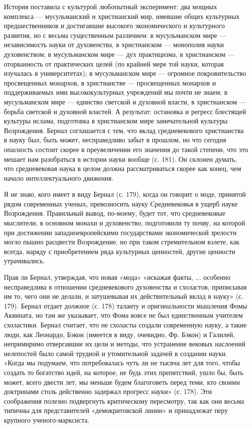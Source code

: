 История  поставила  с  культурой любопытный  эксперимент:  два  мощных
комплекса  ---   мусульманский  и  христианский  мир,   имевшие  общих
культурных  предшественников  и  достигавшие  высокого  экономического
и  культурного  развития,  но   с  весьма  существенным  различием:  в
мусульманском  мире   ---  независимость   науки  от   духовенства,  в
христианском ---  монополия науки  духовенством; в  мусульманском мире
--- дух  практицизма, в христианском ---  оторванность от практических
целей (по крайней мере той  науки, которая изучалась в университетах);
в  мусульманском   мире  ---  огромное   покровительство  просвещенных
монархов, в  христианстве ---  просвещенных монархов  и поддерживаемых
ими  высококультурных учреждений  мы почти  не знаем;  в мусульманском
мире  ---   единство  светской  и  духовной   власти,  в  христианском
---  борьба  светской  и  духовной  властей.  А  результат:  остановка
и  регресс  блестящей  культуры   ислама,  подготовка  в  христианском
мире  замечательной культуры  Возрождения. Бернал  соглашается с  тем,
что  вклад  средневекового  христианства  в  науку  был,  быть  может,
несправедливо забыт в прошлом, но что сегодня опасность состоит скорее
в  преувеличении его  значения до  такой степени,  что это  мешает нам
разобраться в  истории науки вообще  (с. 181). Он склонен  думать, что
средневековая наука  в целом должна рассматриваться  скорее как конец,
чем начало интеллектуального движения.

Я не знаю, кого имеет в виду Бернал (с. 179), когда он говорит о моде,
принятой рядом современных ученых,  превозносить науку Средневековья в
ущерб науке  Возрождения. Правильный  вывод, по-моему, будет  тот, что
средневековые мыслители, в основном  монахи и духовенство, подготовили
ту почву, на которой  при достижении западноевропейскими государствами
экономической  зрелости  могло  пышно расцвести  Возрождение,  но  при
таком стремительном  взлете, как  всегда, наряду с  приобретением ряда
культурных ценностей, другие ценности утрачивались.

Прав  ли  Бернал, утверждая,  что  новая  «мода» «искажая  факты,  ...
особенно  несправедлива  в   отношении  средневекового  духовенства  и
схоластов,  приписывая им  то, чего  они не  делали, и  затушевывая их
действительный вклад в науку» (с. 179). Бернал отдает должное (с. 178)
таланту и оригинальности мышления Фомы  Аквината, но там же указывает,
что  Фома  вовсе  не  был  единственным  учителем  схоластики.  Бернал
считает, что не схоласты создали  современную науку, а такие люди, как
Леонардо,  Бэкон (имеется  в  виду, очевидно,  Фр.  Бэкон) и  Галилей,
непримиримо  отвергавшие  их цели  и  методы,  что устранение  вековых
наслоений  нелепостей  было самой  трудной  и  утомительной задачей  в
создании  науки. «Когда  мы  подумаем, что  потребовалась  чуть ли  не
тысяча лет для  того, чтобы создать то богатство идей,  на которое, не
будь  этих препятствий,  ушло бы,  быть  может, всего  двести лет,  мы
меньше  будем  благоговеть перед  теми,  кто  своими доктринами  столь
действенно задержал прогресс науки»  (с. 178). Эти соображения полезно
подвергнуть критическому  пересмотру, так  как они весьма  типичны для
представителей  «демокритовской  линии»  и принадлежат  перу  крупного
ученого-марксиста.

